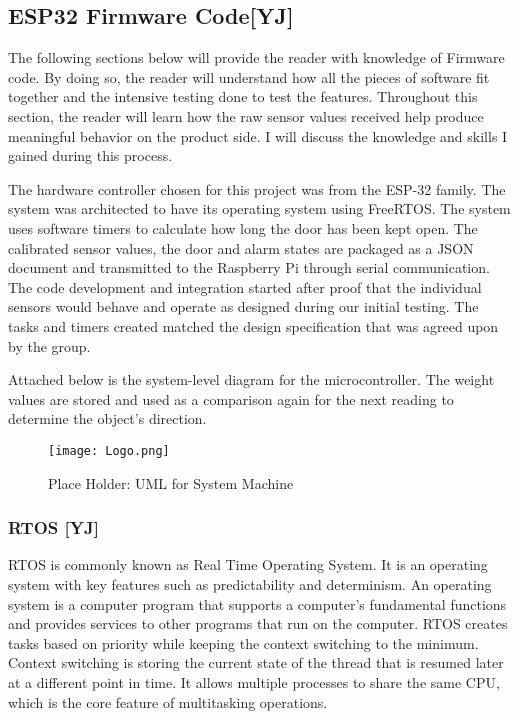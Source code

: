 \subsection{ESP32 Firmware Code[YJ]}

The following sections below will provide the reader with knowledge of Firmware code.
By doing so, the reader will understand how all the pieces of software fit together and the intensive testing done to test the features.
Throughout this section, the reader will learn how the raw sensor values received help produce meaningful behavior on the product side.
I will discuss the knowledge and skills I gained during this process.

The hardware controller chosen for this project was from the ESP-32 family.
The system was architected to have its operating system using FreeRTOS.
The system uses software timers to calculate how long the door has been kept open.
The calibrated sensor values, the door and alarm states are packaged as a JSON document and transmitted to the Raspberry Pi through serial communication.
The code development and integration started after proof that the individual sensors would behave and operate as designed during our initial testing.
The tasks and timers created matched the design specification that was agreed upon by the group.

Attached below is the system-level diagram for the microcontroller.
The weight values are stored and used as a comparison again for the next reading to determine the object's direction.

\begin{figure}[H]        
    \centering
    \texttt{[image: Logo.png]}
    \caption{Place Holder: UML for System Machine}
    \label{fig:placeholder}
\end{figure} 

\subsubsection{RTOS [YJ]}

RTOS is commonly known as Real Time Operating System.
It is an operating system with key features such as predictability and determinism.
An operating system is a computer program that supports a computer's fundamental functions and provides services to other programs that run on the computer.
RTOS creates tasks based on priority while keeping the context switching to the minimum.
Context switching is storing the current state of the thread that is resumed later at a different point in time.
It allows multiple processes to share the same CPU, which is the core feature of multitasking operations.
\cite{RTOS:1} \cite{RTOS:2}

